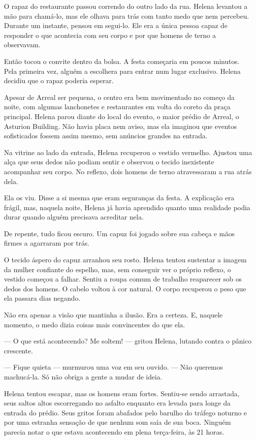O rapaz do restaurante passou correndo do outro lado da rua. Helena levantou a mão para chamá-lo, mas ele olhava para trás com tanto medo que nem percebeu. Durante um instante, pensou em segui-lo. Ele era a única pessoa capaz de responder o que acontecia com seu corpo e por que homens de terno a observavam.

Então tocou o convite dentro da bolsa. A festa começaria em poucos minutos. Pela primeira vez, alguém a escolhera para entrar num lugar exclusivo. Helena decidiu que o rapaz poderia esperar.

Apesar de Arreal ser pequena, o centro era bem movimentado no começo da noite, com algumas lanchonetes e restaurantes em volta do coreto da praça principal.
Helena parou diante do local do evento, o maior prédio de Arreal, o Asturion Building. Não havia placa nem aviso, mas ela imaginou que eventos sofisticados fossem assim mesmo, sem anúncios grandes na entrada.

Na vitrine ao lado da entrada, Helena recuperou o vestido vermelho. Ajustou uma alça que seus dedos não podiam sentir e observou o tecido inexistente acompanhar seu corpo. No reflexo, dois homens de terno atravessaram a rua atrás dela.

Ela os viu. Disse a si mesma que eram seguranças da festa. A explicação era frágil, mas, naquela noite, Helena já havia aprendido quanto uma realidade podia durar quando alguém precisava acreditar nela.

De repente, tudo ficou escuro. Um capuz foi jogado sobre sua cabeça e mãos firmes a agarraram por trás.

O tecido áspero do capuz arranhou seu rosto. Helena tentou sustentar a imagem da mulher confiante do espelho, mas, sem conseguir ver o próprio reflexo, o vestido começou a falhar. Sentiu a roupa comum de trabalho reaparecer sob os dedos dos homens. O cabelo voltou à cor natural. O corpo recuperou o peso que ela passara dias negando.

Não era apenas a visão que mantinha a ilusão. Era a certeza. E, naquele momento, o medo dizia coisas mais convincentes do que ela.

— O que está acontecendo? Me soltem! — gritou Helena, lutando contra o pânico crescente.

— Fique quieta — murmurou uma voz em seu ouvido. — Não queremos machucá-la. Só não obriga a gente a mudar de ideia.

Helena tentou escapar, mas os homens eram fortes. Sentiu-se sendo arrastada, seus saltos altos escorregando no asfalto enquanto era levada para longe da entrada do prédio. Seus gritos foram abafados pelo barulho do tráfego noturno e por uma estranha sensação de que nenhum som saía de sua boca. Ninguém parecia notar o que estava acontecendo em plena terça-feira, às 21 horas.

